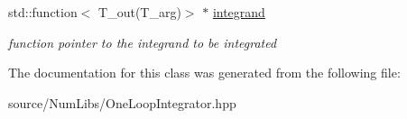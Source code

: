 \begin{DoxyCompactItemize}
\item 
\hypertarget{class_c___one_loop_integrator_a1c5871eec44be782114ba875d88488e0}{std\-::function$<$ T\-\_\-out(T\-\_\-arg)$>$ $\ast$ \hyperlink{class_c___one_loop_integrator_a1c5871eec44be782114ba875d88488e0}{integrand}}\label{class_c___one_loop_integrator_a1c5871eec44be782114ba875d88488e0}

\begin{DoxyCompactList}\small\item\em function pointer to the integrand to be integrated \end{DoxyCompactList}\end{DoxyCompactItemize}


The documentation for this class was generated from the following file\-:\begin{DoxyCompactItemize}
\item 
source/\-Num\-Libs/One\-Loop\-Integrator.\-hpp\end{DoxyCompactItemize}

